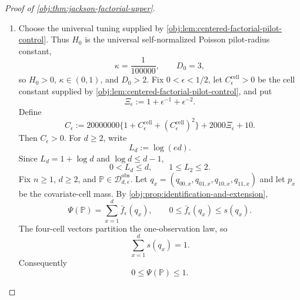 \documentclass[11pt]{article}
\begin{document}
\begin{proof}[Proof of \cref{obj:thm:jackson-factorial-upper}]
\begin{enumerate}
\item Choose the universal tuning supplied by
\cref{obj:lem:centered-factorial-pilot-control}.  Thus \(H_0\) is the
universal self-normalized Poisson pilot-radius constant,
\[
\kappa=\frac{1}{100000},
\qquad
D_0=3,
\]
so \(H_0>0\), \(\kappa\in(0,1)\), and \(D_0>2\).  Fix
\(0<\epsilon<1/2\), let \(C_{\epsilon}^{\mathrm{cell}}>0\) be the cell
constant supplied by \cref{obj:lem:centered-factorial-pilot-control}, and put
\[
\Xi_\epsilon:=1+\epsilon^{-1}+\epsilon^{-2}.
\]
Define
\[
C_\epsilon
:=
20000000\{1+C_{\epsilon}^{\mathrm{cell}}+(C_{\epsilon}^{\mathrm{cell}})^2\}
+
2000\Xi_\epsilon+10 .
\]
Then \(C_\epsilon>0\).  For \(d\ge2\), write
\[
L_d:=\log(ed).
\]
Since \(L_d=1+\log d\) and \(\log d\le d-1\),
\[
0<L_d\le d,
\qquad
1\le L_2\le2 .
\]
Fix \(n\ge1\), \(d\ge2\), and
\(\mathbb P\in\mathcal D_{d,\epsilon}^{\mathrm{obs}}\).  Let
\(q_x=(q_{00,x},q_{01,x},q_{10,x},q_{11,x})\) and let \(p_x\) be the
covariate-cell mass.  By \cref{obj:prop:identification-and-extension},
\[
\Psi(\mathbb P)=\sum_{x=1}^d \bar f_\epsilon(q_x),
\qquad
0\le \bar f_\epsilon(q_x)\le s(q_x).
\]
The four-cell vectors partition the one-observation law, so
\[
\sum_{x=1}^d s(q_x)=1 .
\]
Consequently
\[
0\le \Psi(\mathbb P)\le1 .
\]


\end{enumerate}
\end{proof}
\end{document}

